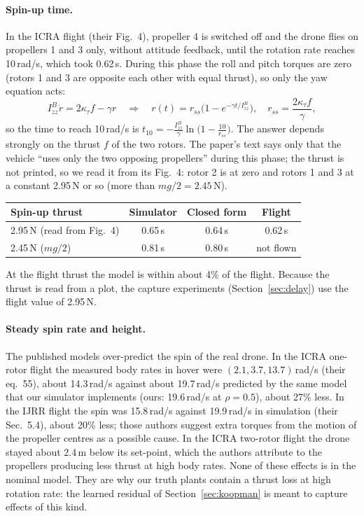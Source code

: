 \paragraph{Spin-up time.} In the ICRA flight (their Fig.~4), propeller 4 is switched off and the drone flies on propellers 1 and 3 only, without attitude feedback, until the rotation rate reaches 10\,rad/s, which took 0.62\,s. During this phase the roll and pitch torques are zero (rotors 1 and 3 are opposite each other with equal thrust), so only the yaw equation acts:
\begin{equation}
  I^B_{zz}\dot r = 2\kappa_\tau f - \gamma r \quad\Rightarrow\quad r(t) = r_{ss}\big(1 - e^{-\gamma t/I^B_{zz}}\big),\quad r_{ss} = \frac{2\kappa_\tau f}{\gamma},
\end{equation}
so the time to reach 10\,rad/s is $t_{10} = -\frac{I^B_{zz}}{\gamma}\ln\!\big(1 - \tfrac{10}{r_{ss}}\big)$. The answer depends strongly on the thrust $f$ of the two rotors. The paper's text says only that the vehicle ``uses only the two opposing propellers'' during this phase; the thrust is not printed, so we read it from its Fig.~4: rotor 2 is at zero and rotors 1 and 3 at a constant 2.95\,N or so (more than $mg/2 = 2.45$\,N).

\begin{center}\small
\begin{tabular}{lccc}
\toprule
Spin-up thrust & Simulator & Closed form & Flight \\
\midrule
2.95\,N (read from Fig.~4) & 0.65\,s & 0.64\,s & 0.62\,s \\
2.45\,N ($mg/2$) & 0.81\,s & 0.80\,s & not flown \\
\bottomrule
\end{tabular}
\end{center}
At the flight thrust the model is within about 4\% of the flight. Because the thrust is read from a plot, the capture experiments (Section~\ref{sec:delay}) use the flight value of 2.95\,N.

\paragraph{Steady spin rate and height.} The published models over-predict the spin of the real drone. In the ICRA one-rotor flight the measured body rates in hover were $(2.1, 3.7, 13.7)$\,rad/s (their eq.~55), about 14.3\,rad/s against about 19.7\,rad/s predicted by the same model that our simulator implements (ours: 19.6\,rad/s at $\rho = 0.5$), about 27\% less. In the IJRR flight the spin was 15.8\,rad/s against 19.9\,rad/s in simulation (their Sec.~5.4), about 20\% less; those authors suggest extra torques from the motion of the propeller centres as a possible cause. In the ICRA two-rotor flight the drone stayed about 2.4\,m below its set-point, which the authors attribute to the propellers producing less thrust at high body rates. None of these effects is in the nominal model. They are why our truth plants contain a thrust loss at high rotation rate: the learned residual of Section~\ref{sec:koopman} is meant to capture effects of this kind.


